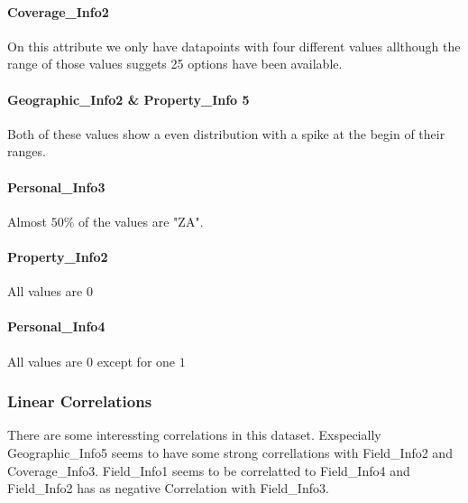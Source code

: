 \paragraph{Coverage\_Info2} On this attribute we only have datapoints with four different values allthough the range of those values suggets 25 options have been available.

\paragraph{Geographic\_Info2 \& Property\_Info 5} Both of these values show a  even distribution with a spike at the begin of their ranges.

\paragraph{Personal\_Info3} Almost $50 \text{\%}$ of the values are "ZA".
\paragraph{Property\_Info2} All values are $0$
\paragraph{Personal\_Info4} All values are $0$ except for one $1$

\subsubsection{Linear Correlations}

There are some interessting correlations in this dataset. Exspecially Geographic\_Info5 seems to have some strong correllations with Field\_Info2 and Coverage\_Info3. Field\_Info1 seems to be correlatted to Field\_Info4 and Field\_Info2 has as negative Correlation with Field\_Info3.






